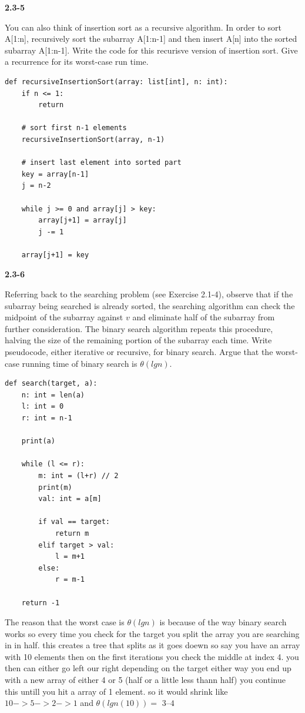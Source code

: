 \textbf{2.3-5}

You can also think of insertion sort as a recursive algorithm. In order to sort
A[1:n], recursively sort the subarray A[1:n-1] and then insert A[n] into the sorted subarray
A[1:n-1]. Write the code for this recurisve version of insertion sort. Give a recurrence for 
its worst-case run time. \\

\begin{verbatim}
def recursiveInsertionSort(array: list[int], n: int):
    if n <= 1:
        return

    # sort first n-1 elements
    recursiveInsertionSort(array, n-1)

    # insert last element into sorted part
    key = array[n-1]
    j = n-2

    while j >= 0 and array[j] > key:
        array[j+1] = array[j]
        j -= 1

    array[j+1] = key

\end{verbatim}

\textbf{2.3-6}

Referring back to the searching problem (see Exercise 2.1-4), observe that if the 
subarray being searched is already sorted, the searching algorithm can check the 
midpoint of the subarray against $v$ and eliminate half of the subarray from further
consideration. The binary search algorithm repeats this procedure, halving the 
size of the remaining portion of the subarray each time. Write pseudocode, either 
iterative or recursive, for binary search. Argue that the worst-case running time of 
binary search is  $\theta(lgn)$. \\

\begin{verbatim}
def search(target, a):
    n: int = len(a)
    l: int = 0
    r: int = n-1
    
    print(a)
    
    while (l <= r):
        m: int = (l+r) // 2
        print(m)
        val: int = a[m]
        
        if val == target:
            return m
        elif target > val:
            l = m+1
        else:
            r = m-1
            
    return -1
\end{verbatim}

The reason that the worst case is $\theta(lgn)$ is because of the way binary search works
so every time you check for the target you split the array you are searching in in half.
this creates a tree that splits as it goes doewn so say you have an array with 10 elements then
on the first iterations you check the middle at index 4. you then can either go left our right depending
on the target either way you end up with a new array of either 4 or 5 (half or a little less thann half)
you continue this untill you hit a array of 1 element. so it would shrink like $10 -> 5 -> 2 -> 1$ and 
$\theta(lgn(10)) = $ $3$--$4$  \\

